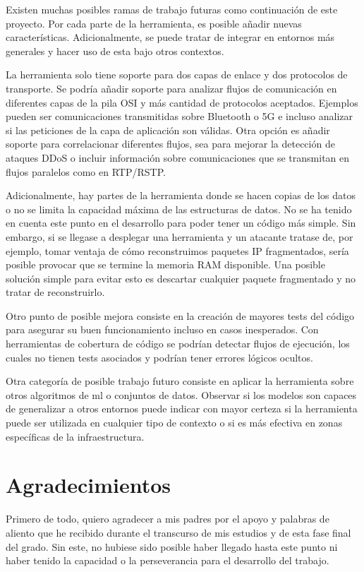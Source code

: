 Existen muchas posibles ramas de trabajo futuras como continuación de este proyecto. Por cada parte de la herramienta, es posible añadir nuevas características. Adicionalmente, se puede tratar de integrar en entornos más generales y hacer uso de esta bajo otros contextos.

La herramienta solo tiene soporte para dos capas de enlace y dos protocolos de transporte. Se podría añadir soporte para analizar flujos de comunicación en diferentes capas de la pila OSI y más cantidad de protocolos aceptados. Ejemplos pueden ser comunicaciones transmitidas sobre Bluetooth o 5G e incluso analizar si las peticiones de la capa de aplicación son válidas. Otra opción es añadir soporte para correlacionar diferentes flujos, sea para mejorar la detección de ataques DDoS o incluir información sobre comunicaciones que se transmitan en flujos paralelos como en RTP/RSTP.

Adicionalmente, hay partes de la herramienta donde se hacen copias de los datos o no se limita la capacidad máxima de las estructuras de datos. No se ha tenido en cuenta este punto en el desarrollo para poder tener un código más simple. Sin embargo, si se llegase a desplegar una herramienta y un atacante tratase de, por ejemplo, tomar ventaja de cómo reconstruimos paquetes IP fragmentados, sería posible provocar que se termine la memoria RAM disponible. Una posible solución simple para evitar esto es descartar cualquier paquete fragmentado y no tratar de reconstruirlo. 

Otro punto de posible mejora consiste en la creación de mayores tests del código para asegurar su buen funcionamiento incluso en casos inesperados. Con herramientas de cobertura de código se podrían detectar flujos de ejecución, los cuales no tienen tests asociados y podrían tener errores lógicos ocultos.

Otra categoría de posible trabajo futuro consiste en aplicar la herramienta sobre otros algoritmos de \gls{ml} o conjuntos de datos. Observar si los modelos son capaces de generalizar a otros entornos puede indicar con mayor certeza si la herramienta puede ser utilizada en cualquier tipo de contexto o si es más efectiva en zonas específicas de la infraestructura.

\section{Agradecimientos}

Primero de todo, quiero agradecer a mis padres por el apoyo y palabras de aliento que he recibido durante el transcurso de mis estudios y de esta fase final del grado. Sin este, no hubiese sido posible haber llegado hasta este punto ni haber tenido la capacidad o la perseverancia para el desarrollo del trabajo.

